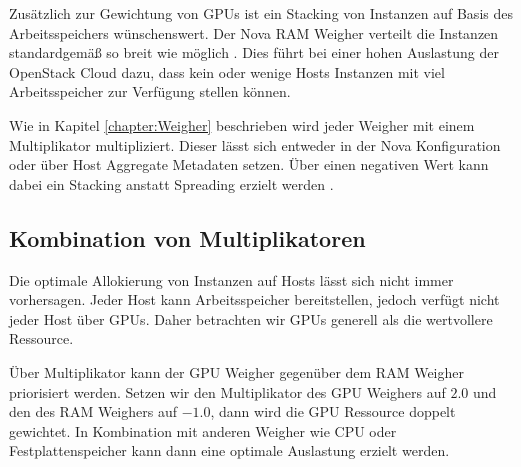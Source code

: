 \documentclass[../Main.tex]{subfiles}
\begin{document}
Zusätzlich zur Gewichtung von GPUs ist ein Stacking von Instanzen auf Basis des Arbeitsspeichers
wünschenswert. Der Nova RAM Weigher verteilt die Instanzen standardgemä{\ss} so breit wie möglich \citep{NormalizedWeights}.
Dies führt bei einer hohen Auslastung der OpenStack Cloud dazu, dass kein oder wenige Hosts Instanzen
mit viel Arbeitsspeicher zur Verfügung stellen können.

Wie in Kapitel \ref{chapter:Weigher} beschrieben wird jeder Weigher mit einem Multiplikator multipliziert. Dieser
lässt sich entweder in der Nova Konfiguration oder über Host Aggregate Metadaten setzen.
Über einen negativen Wert kann dabei ein Stacking anstatt Spreading erzielt werden \citep{ComputeSchedulers}.

\subsection{Kombination von Multiplikatoren}

Die optimale Allokierung von Instanzen auf Hosts lässt sich nicht immer vorhersagen.
Jeder Host kann Arbeitsspeicher bereitstellen, jedoch verfügt nicht jeder Host über GPUs.
Daher betrachten wir GPUs generell als die \glqq wertvollere\grqq{} Ressource.

Über Multiplikator kann der GPU Weigher gegenüber dem RAM Weigher priorisiert werden. Setzen wir
den Multiplikator des GPU Weighers auf $2.0$ und den des RAM Weighers auf $-1.0$, dann wird
die GPU Ressource doppelt gewichtet. In Kombination mit anderen Weigher wie CPU oder Festplattenspeicher
kann dann eine optimale Auslastung erzielt werden.

\biblio %
\end{document}

